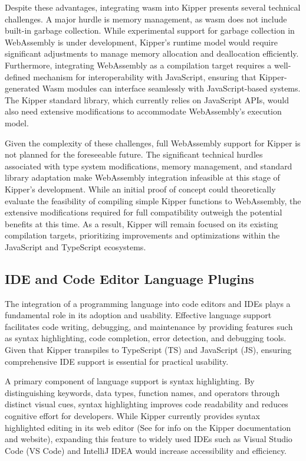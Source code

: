 Despite these advantages, integrating \acrshort{wasm} into Kipper presents several technical challenges. A major hurdle is memory management, as \acrshort{wasm} does not include built-in garbage collection. While experimental support for garbage collection in WebAssembly is under development, Kipper's runtime model would require significant adjustments to manage memory allocation and deallocation efficiently. Furthermore, integrating WebAssembly as a compilation target requires a well-defined mechanism for interoperability with JavaScript, ensuring that Kipper-generated Wasm modules can interface seamlessly with JavaScript-based systems. The Kipper standard library, which currently relies on JavaScript APIs, would also need extensive modifications to accommodate WebAssembly's execution model.

Given the complexity of these challenges, full WebAssembly support for Kipper is not planned for the foreseeable future. The significant technical hurdles associated with type system modifications, memory management, and standard library adaptation make WebAssembly integration infeasible at this stage of Kipper's development. While an initial proof of concept could theoretically evaluate the feasibility of compiling simple Kipper functions to WebAssembly, the extensive modifications required for full compatibility outweigh the potential benefits at this time. As a result, Kipper will remain focused on its existing compilation targets, prioritizing improvements and optimizations within the JavaScript and TypeScript ecosystems.

\subsection{IDE and Code Editor Language Plugins}

The integration of a programming language into code editors and IDEs plays a fundamental role in its adoption and usability. Effective language support facilitates code writing, debugging, and maintenance by providing features such as syntax highlighting, code completion, error detection, and debugging tools. Given that Kipper transpiles to TypeScript (TS) and JavaScript (JS), ensuring comprehensive IDE support is essential for practical usability.

A primary component of language support is syntax highlighting. By distinguishing keywords, data types, function names, and operators through distinct visual cues, syntax highlighting improves code readability and reduces cognitive effort for developers. While Kipper currently provides syntax highlighted editing in its web editor (See  for info on the Kipper documentation and website), expanding this feature to widely used IDEs such as Visual Studio Code (VS Code) and IntelliJ IDEA would increase accessibility and efficiency.

